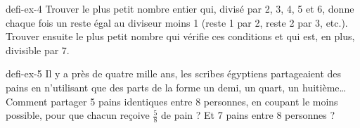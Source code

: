 \begin{blocEdition}{defi-ex-4}
Trouver le plus petit nombre entier qui, divisé par 2, 3, 4, 5 et 6, donne chaque fois un reste égal au diviseur moins 1 (reste 1 par 2, reste 2 par 3, etc.). Trouver ensuite le plus petit nombre qui vérifie ces conditions et qui est, en plus, divisible par 7.\par{}\par\par{}\par{}\par{}\par{}\par{}\par{}
\end{blocEdition}
\begin{blocEdition}{defi-ex-5}
Il y a près de quatre mille ans, les scribes égyptiens partageaient des pains en n’utilisant que des parts de la forme un demi, un quart, un huitième… Comment partager 5 pains identiques entre 8 personnes, en coupant le moins possible, pour que chacun reçoive $\frac58$ de pain ? Et 7 pains entre 8 personnes ?\par{}\par\par{}\par{}\par{}\par{}\par{}\par{}
\end{blocEdition}
